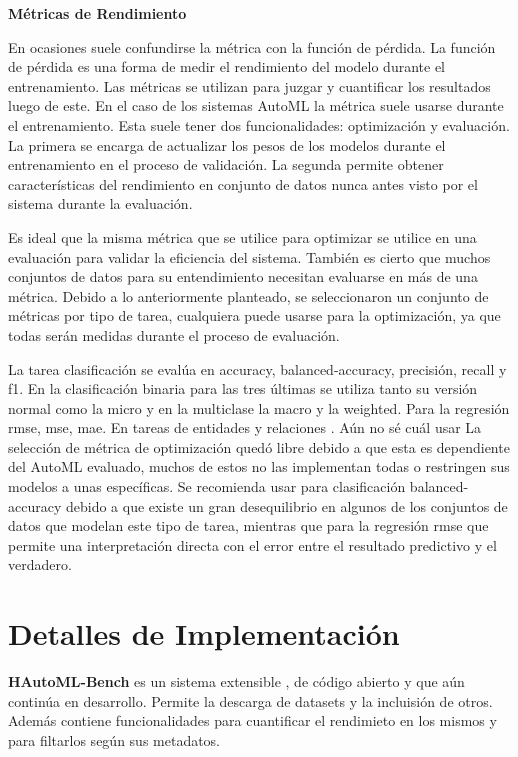 \begin{flushleft} 
    {\large { \textbf{Métricas de Rendimiento}}}\label{section:metrics}
\end{flushleft}
En ocasiones suele confundirse la métrica con la función de pérdida. La función de pérdida es una forma de medir el rendimiento del modelo durante el 
entrenamiento. Las métricas se utilizan para juzgar y cuantificar los resultados luego de este. En el caso de los sistemas AutoML la métrica suele usarse 
durante el entrenamiento. Esta suele tener dos funcionalidades: optimización y evaluación. La primera se encarga de actualizar los pesos de los modelos durante el 
entrenamiento en el proceso de validación. La segunda permite obtener características del rendimiento en conjunto de datos nunca antes visto por el sistema durante 
la evaluación.

Es ideal que la misma métrica que se utilice para optimizar se utilice en una evaluación para validar la eficiencia del sistema. También es cierto que muchos conjuntos 
de datos para su entendimiento necesitan evaluarse en más de una métrica. Debido a lo anteriormente planteado, se seleccionaron un conjunto de métricas por tipo de 
tarea, cualquiera puede usarse para la optimización, ya que todas serán medidas durante el proceso de evaluación.

La tarea clasificación se evalúa en accuracy, balanced-accuracy, precisión, recall y f1.  En la clasificación binaria para las tres últimas se utiliza tanto su versión 
normal como la micro y en la multiclase la macro y la weighted. Para la regresión rmse, mse, mae. En tareas de entidades y relaciones . Aún no sé cuál usar 
La selección de métrica de optimización quedó libre debido a que esta es dependiente del AutoML evaluado, muchos de estos no las implementan todas o 
restringen sus modelos a unas específicas. Se recomienda usar para clasificación balanced-accuracy debido a que existe un gran desequilibrio en algunos de 
los conjuntos de datos que modelan este tipo de tarea, mientras que para la regresión rmse que permite una interpretación directa con el error entre el resultado 
predictivo y el verdadero.

\section{Detalles de Implementación}\label{section:Implementation}
\textbf{HAutoML-Bench} es un sistema extensible , de código abierto y que aún continúa en desarrollo. Permite la descarga de datasets y la incluisión de otros. 
Además contiene funcionalidades para cuantificar el rendimieto en los mismos y para filtarlos según sus metadatos.

